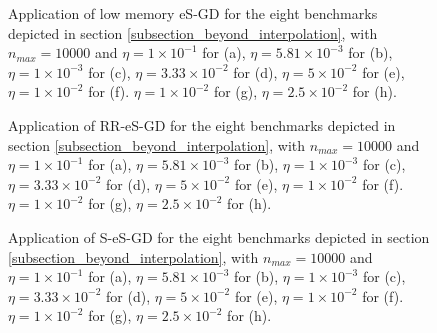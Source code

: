 \documentclass[article,authoryear,jmlmc]{beg_32}             %
\begin{document}
\begin{figure}[h!]
	\centering
	\scalebox{0.60}{}
        \caption{
          Application of low memory eS-GD for the eight benchmarks depicted in section \ref{subsection_beyond_interpolation}, with $n_{max}=10000$ and
 $\eta = 1   \times 10^{-1}$  for \exOne    (a),
 $\eta = 5.81\times 10^{-3}$  for \exTwo    (b),
 $\eta = 1   \times 10^{-3}$  for \exThree  (c),
 $\eta = 3.33\times 10^{-2}$  for \exFour   (d),
 $\eta = 5   \times 10^{-2}$  for \exFive   (e),
 $\eta = 1   \times 10^{-2}$  for \exSix    (f).
 $\eta = 1   \times 10^{-2}$  for \exSeven  (g),
 $\eta = 2.5 \times 10^{-2}$  for \exHeight (h).
}
	\label{SPETH_exs}
\end{figure}

\begin{figure}[h!]
	\centering
	\scalebox{0.60}{}
        \caption{
          Application of RR-eS-GD for the eight benchmarks depicted in section \ref{subsection_beyond_interpolation}, with $n_{max}=10000$ and
 $\eta = 1   \times 10^{-1}$  for \exOne    (a),
 $\eta = 5.81\times 10^{-3}$  for \exTwo    (b),
 $\eta = 1   \times 10^{-3}$  for \exThree  (c),
 $\eta = 3.33\times 10^{-2}$  for \exFour   (d),
 $\eta = 5   \times 10^{-2}$  for \exFive   (e),
 $\eta = 1   \times 10^{-2}$  for \exSix    (f).
 $\eta = 1   \times 10^{-2}$  for \exSeven  (g),
 $\eta = 2.5 \times 10^{-2}$  for \exHeight (h).
}
	\label{RR_SPETH_exs}
\end{figure}


\begin{figure}[h!]
	\centering
	\scalebox{0.60}{}
        \caption{
          Application of S-eS-GD for the eight benchmarks depicted in section \ref{subsection_beyond_interpolation}, with $n_{max}=10000$ and
 $\eta = 1   \times 10^{-1}$  for \exOne    (a),
 $\eta = 5.81\times 10^{-3}$  for \exTwo    (b),
 $\eta = 1   \times 10^{-3}$  for \exThree  (c),
 $\eta = 3.33\times 10^{-2}$  for \exFour   (d),
 $\eta = 5   \times 10^{-2}$  for \exFive   (e),
 $\eta = 1   \times 10^{-2}$  for \exSix    (f).
 $\eta = 1   \times 10^{-2}$  for \exSeven  (g),
 $\eta = 2.5 \times 10^{-2}$  for \exHeight (h).
}
	\label{S_SPETH_exs}
\end{figure}
\end{document}
